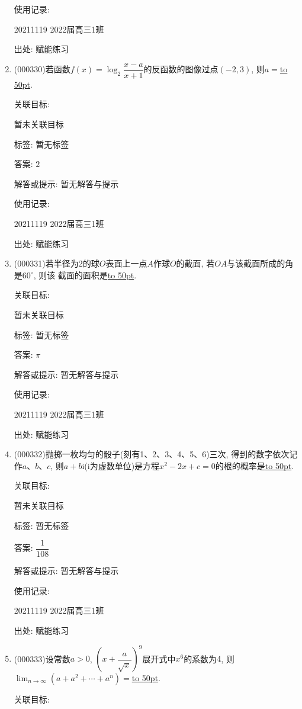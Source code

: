\documentclass[10pt,a4paper]{article}
\newcommand{\blank}[1]{\underline{\hbox to #1pt{}}}
\begin{document}
\begin{enumerate}[1.]
使用记录:

20211119	2022届高三1班	


出处: 赋能练习
\item { (000330)}若函数$f(x)=\log_2\dfrac{x-a}{x+1}$的反函数的图像过点$(-2,3)$, 则$a=$\blank{50}.


关联目标:

暂未关联目标



标签: 暂无标签

答案: $2$

解答或提示: 暂无解答与提示

使用记录:

20211119	2022届高三1班	


出处: 赋能练习
\item { (000331)}若半径为2的球$O$表面上一点$A$作球$O$的截面, 若$OA$与该截面所成的角是$60^\circ$, 则该
截面的面积是\blank{50}.


关联目标:

暂未关联目标



标签: 暂无标签

答案: $\pi$

解答或提示: 暂无解答与提示

使用记录:

20211119	2022届高三1班	


出处: 赋能练习
\item { (000332)}抛掷一枚均匀的骰子(刻有1、2、3、4、5、6)三次, 得到的数字依次记作$a$、$b$、$c$, 则$a+b\mathrm{i}$($\mathrm{i}$为虚数单位)是方程$x^2-2x+c=0$的根的概率是\blank{50}.


关联目标:

暂未关联目标



标签: 暂无标签

答案: $\dfrac 1{108}$

解答或提示: 暂无解答与提示

使用记录:

20211119	2022届高三1班	


出处: 赋能练习
\item { (000333)}设常数$a>0$, $(x+\dfrac{a}{\sqrt{x}})^9$展开式中$x^6$的系数为$4$, 则$\displaystyle\lim_{n\to \infty}(a+a^2+\cdots+a^n)=$\blank{50}.


关联目标:


\end{enumerate}
\end{document}
